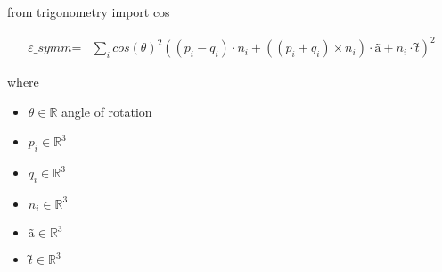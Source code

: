 \documentclass[12pt]{article}
\begin{document}
from trigonometry import cos

\begin{align*}
\textit{ε\_symm} = & \sum_\textit{i} cos\left( \textit{θ} \right)^{2}\left( \left( \textit{p}_{ \textit{i} } - \textit{q}_{ \textit{i} } \right) \cdot \textit{n}_{ \textit{i} } + \left( \left( \textit{p}_{ \textit{i} } + \textit{q}_{ \textit{i} } \right) × \textit{n}_{ \textit{i} } \right) \cdot \textit{ã} + \textit{n}_{ \textit{i} } \cdot \textit{t̃} \right)^{2}
\end{align*}

where
\begin{itemize}
\item $\textit{θ} \in \mathbb{{R}}$ angle of rotation
\item $\textit{p}_{\textit{i}} \in \mathbb{R}^{ 3}$
\item $\textit{q}_{\textit{i}} \in \mathbb{R}^{ 3}$
\item $\textit{n}_{\textit{i}} \in \mathbb{R}^{ 3}$
\item $\textit{ã} \in \mathbb{R}^{ 3}$
\item $\textit{t̃} \in \mathbb{R}^{ 3}$
\end{itemize}
\end{document}
